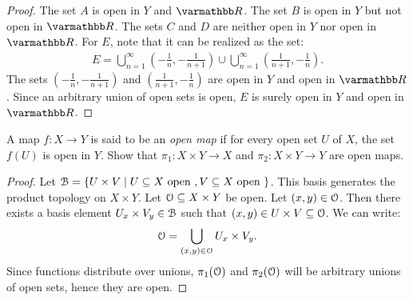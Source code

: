 \documentclass[12pt,twoside,openany]{memoir}
\begin{document}
    \begin{proof}
        The set $A$ is open in $Y$ and $\bfR$. The set $B$ is open in $Y$ but not open in $\bfR$. The sets $C$ and $D$ are neither open in $Y$ nor open in $\bfR$. For $E$, note that it can be realized as the set:
            \begin{equation*}
            \begin{split}
                E = \bigcup_{n = 1}^\infty \left( -\frac{1}{n}, - \frac{1}{n+1} \right) \cup \bigcup_{n = 1}^\infty \left( \frac{1}{n+1}, - \frac{1}{n} \right).
            \end{split}
            \end{equation*} 
        The sets $\left( -\frac{1}{n}, - \frac{1}{n+1} \right)$ and $\left( \frac{1}{n+1}, - \frac{1}{n} \right)$ are open in $Y$ and open in $\bfR$. Since an arbitrary union of open sets is open, $E$ is surely open in $Y$ and open in $\bfR$.
    \end{proof}
\begin{exercise}
    A map $f:X \rightarrow Y$ is said to be an \textit{open map} if for every open set $U$ of $X$, the set $f(U)$ is open in $Y$. Show that $\pi_1:X \times Y \rightarrow X$ and $\pi_2 :X \times Y \rightarrow Y$ are open maps.
\end{exercise}
    \begin{proof}
        Let $\mathcal{B} =\{U \times V \mid U \subseteq X \text{ open }, V \subseteq X \text{ open }\}$. This basis generates the product topology on $X \times Y$. Let $\mathcal{O} \subseteq X \times Y$ be open. Let $(x,y) \in \mathcal{O}$. Then there exists a basis element $U_x \times V_y \in \mathcal{B}$ such that $(x,y) \in U \times V \subseteq \mathcal{O}$. We can write:
            \begin{equation*}
            \begin{split}
                \mathcal{O} = \bigcup_{(x,y) \in \mathcal{O}}U_x \times V_y.
            \end{split}
            \end{equation*}
        Since functions distribute over unions, $\pi_1(\mathcal{O})$ and $\pi_2(\mathcal{O})$ will be arbitrary unions of open sets, hence they are open.
    \end{proof}
\end{document}
